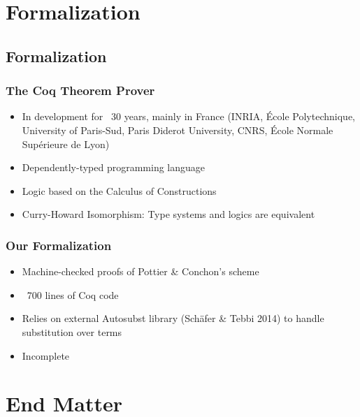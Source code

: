 \documentclass{beamer}
\begin{document}
\section{Formalization}
\subsection{Formalization}
\begin{frame}
  \frametitle{The Coq Theorem Prover}
  \begin{itemize}
    \item In development for ~30 years, mainly in France (INRIA, \'{E}cole
          Polytechnique, University of Paris-Sud, Paris Diderot University,
          CNRS, \'{E}cole Normale Supérieure de Lyon)
    \item Dependently-typed programming language
    \item Logic based on the Calculus of Constructions
    \item Curry-Howard Isomorphism: Type systems and logics are equivalent
  \end{itemize}
\end{frame}
\begin{frame}
  \frametitle{Our Formalization}
  \begin{itemize}
    \item Machine-checked proofs of Pottier \& Conchon's scheme
    \item ~700 lines of Coq code
    \item Relies on external Autosubst library (Sch\"{a}fer \& Tebbi 2014)
          to handle substitution over terms
    \item Incomplete
  \end{itemize}
\end{frame}
\section{End Matter}
\end{document}
